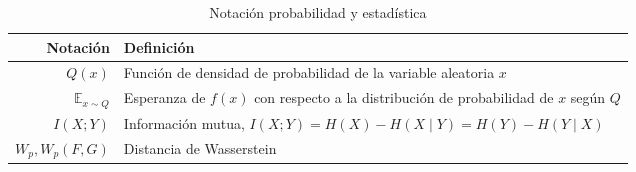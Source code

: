 \begin{table}[H]
    \begin{center}
        \begin{tabularx}{\textwidth}{|r|X|}
            \hline
            \textbf{Notación}         & \textbf{Definición}                                                                     \\
            \hline %
            ${Q(x)}$                  & Función de densidad de probabilidad de la variable aleatoria ${x}$                      \\
            ${\mathbb{E}_{x \sim Q}}$ & Esperanza de $f(x)$ con respecto a la distribución de probabilidad de ${x}$ según ${Q}$ \\
            ${I(X;Y)}$                & Información mutua, ${I(X;Y)=H(X)-H(X\mid{}Y)=H(Y)-H(Y\mid{}X)}$                         \\
            ${W_{p}, W_{p}(F,G)}$     & Distancia de Wasserstein                                                                \\
            \hline
        \end{tabularx}
        \caption{Notación probabilidad y estadística}
        \label{tab:notation-p-e}
    \end{center}
\end{table}










